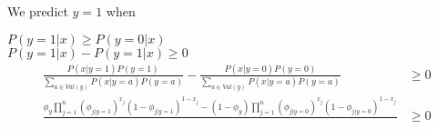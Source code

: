 \documentclass[11pt]{article}
\begin{document}
We predict $y=1$ when 

$P(y=1|x) \geq P(y=0|x)$ \\
$P(y=1|x) - P(y=1|x) \geq 0$ \\

\begin{align*}
    \frac{P(x|y=1)P(y=1)}{\sum_{a \in Val(y)} P(x|y=a)P(y=a)} - \frac{P(x|y=0)P(y=0)}{\sum_{a \in Val(y)} P(x|y=a)P(y=a)} &\geq 0 \\
    \frac{\phi_y \prod_{j=1}^n (\phi_{j|y=1})^{x_j} (1 - \phi_{j|y=1})^{1-x_j} - (1 - \phi_y) \prod_{j=1}^n (\phi_{j|y=0})^{x_j} (1 - \phi_{j|y=0})^{1 - x_j}}{} &\geq 0 \\
\end{align*}
\end{document}
